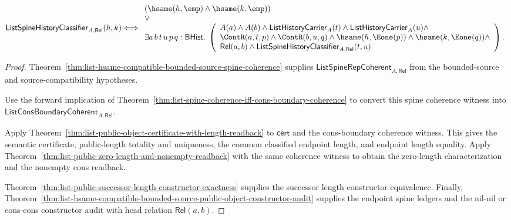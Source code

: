 \begin{theorem}
\begin{enumerate}
  $$
  \mathsf{ListSpineHistoryClassifier}_{A,\mathsf{Rel}}(h,k)
  \Longleftrightarrow
  \begin{array}{l}
  (\hsame(h,\emp)\land \hsame(k,\emp))\\
  \lor\\
  \exists a\,b\,t\,u\,p\,q:\mathsf{BHist}.\;
  \left(
  \begin{array}{l}
  A(a)\land A(b)\land \mathsf{ListHistoryCarrier}_A(t)\land
  \mathsf{ListHistoryCarrier}_A(u)\land\\
  \ContR(a,t,p)\land \ContR(b,u,q)\land
  \hsame(h,\Eone(p))\land \hsame(k,\Eone(q))\land\\
  \mathsf{Rel}(a,b)\land
  \mathsf{ListSpineHistoryClassifier}_{A,\mathsf{Rel}}(t,u)
  \end{array}
  \right).
  \end{array}
  $$
\end{enumerate}
\end{theorem}
\begin{proof}
Theorem~\ref{thm:list-hsame-compatible-bounded-source-spine-coherence} supplies
$\mathsf{ListSpineRepCoherent}_{A,\mathsf{Rel}}$ from the bounded-source and
source-compatibility hypotheses.

Use the forward implication of
Theorem~\ref{thm:list-spine-coherence-iff-cons-boundary-coherence} to convert
this spine coherence witness into
$\mathsf{ListConsBoundaryCoherent}_{A,\mathsf{Rel}}$.

Apply Theorem~\ref{thm:list-public-object-certificate-with-length-readback} to
$\mathsf{cert}$ and the cons-boundary coherence witness. This gives the
semantic certificate, public-length totality and uniqueness, the common
classified endpoint length, and endpoint length equality. Apply
Theorem~\ref{thm:list-public-zero-length-and-nonempty-readback} with the same
coherence witness to obtain the zero-length characterization and the nonempty
cons readback.

Theorem~\ref{thm:list-public-successor-length-constructor-exactness} supplies
the successor length constructor equivalence. Finally,
Theorem~\ref{thm:list-hsame-compatible-bounded-source-public-object-constructor-audit}
supplies the endpoint spine ledgers and the nil-nil or cons-cons constructor
audit with head relation $\mathsf{Rel}(a,b)$.
\end{proof}

